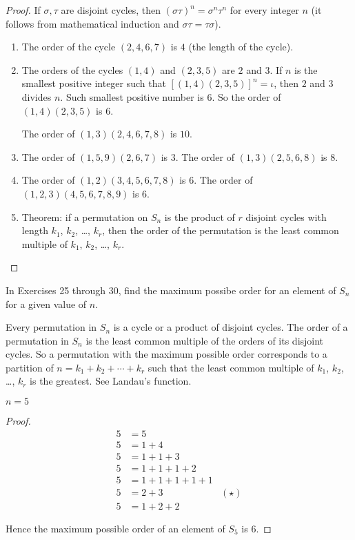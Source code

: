 \begin{proof}
    If $\sigma, \tau$ are disjoint cycles, then ${(\sigma\tau)}^{n} = \sigma^{n}\tau^{n}$ for every integer $n$ (it follows from mathematical induction and $\sigma\tau = \tau\sigma$).

    \begin{enumerate}[label={\textbf{\alph*.}}]
        \item The order of the cycle $(2, 4, 6, 7)$ is $4$ (the length of the cycle).
        \item The orders of the cycles $(1, 4)$ and $(2, 3, 5)$ are $2$ and $3$. If $n$ is the smallest positive integer such that ${[(1, 4)(2, 3, 5)]}^{n} = \iota$, then $2$ and $3$ divides $n$. Such smallest positive number is $6$. So the order of $(1, 4)(2, 3, 5)$ is $6$.

              The order of $(1, 3)(2, 4, 6, 7, 8)$ is $10$.
        \item The order of $(1, 5, 9)(2, 6, 7)$ is $3$. The order of $(1, 3)(2, 5, 6, 8)$ is $8$.
        \item The order of $(1, 2)(3, 4, 5, 6, 7, 8)$ is $6$. The order of $(1, 2, 3)(4, 5, 6, 7, 8, 9)$ is $6$.
        \item Theorem: if a permutation on $S_{n}$ is the product of $r$ disjoint cycles with length $k_{1}$, $k_{2}$, \ldots, $k_{r}$, then the order of the permutation is the least common multiple of $k_{1}$, $k_{2}$, \ldots, $k_{r}$.\qedhere
    \end{enumerate}
\end{proof}

In Exercises 25 through 30, find the maximum possibe order for an element of $S_{n}$ for a given value of $n$.

Every permutation in $S_{n}$ is a cycle or a product of disjoint cycles. The order of a permutation in $S_{n}$ is the least common multiple of the orders of its disjoint cycles. So a permutation with the maximum possible order corresponds to a partition of $n = k_{1} + k_{2} + \cdots + k_{r}$ such that the least common multiple of $k_{1}$, $k_{2}$, \ldots, $k_{r}$ is the greatest. See Landau's function.

\begin{exercise}
    $n = 5$
\end{exercise}

\begin{proof}
    \begin{align*}
        5 & = 5                           \\
        5 & = 1 + 4                       \\
        5 & = 1 + 1 + 3                   \\
        5 & = 1 + 1 + 1 + 2               \\
        5 & = 1 + 1 + 1 + 1 + 1           \\
        5 & = 2 + 3             & (\star) \\
        5 & = 1+ 2 + 2
    \end{align*}

    Hence the maximum possible order of an element of $S_{5}$ is $6$.
\end{proof}

